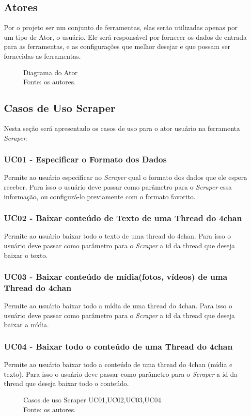 \subsection{Atores}
Por o projeto ser um conjunto de ferramentas, elas serão utilizadas apenas por um tipo de Ator, o usuário. Ele será responsável por fornecer os dados de entrada para as ferramentas, e as configurações que melhor desejar e que possam ser fornecidas as ferramentas.
\begin{figure}[H]
    \centering
    
    \caption[Diagrama do Ator]{\label{fig:diagrama_do_ator}
        Diagrama do Ator\\
        Fonte: os autores.
    }
\end{figure}
\subsection{Casos de Uso Scraper}
Nesta seção será apresentado os casos de uso para o ator usuário na ferramenta \textit{Scraper}.
\subsubsection{UC01 - Especificar o Formato dos Dados}
Permite ao usuário especificar ao \textit{Scraper} qual o formato dos dados que ele espera receber. Para isso o usuário deve passar como parâmetro para o \textit{Scraper} essa informação, ou configurá-lo previamente com o formato favorito.
\subsubsection{UC02 - Baixar conteúdo de Texto de uma Thread do 4chan}
Permite ao usuário baixar todo o texto de uma thread do 4chan. Para isso o usuário deve passar como parâmetro para o \textit{Scraper} a id da thread que deseja baixar o texto.
\subsubsection{UC03 - Baixar conteúdo de mídia(fotos, vídeos)  de uma Thread do 4chan}
Permite ao usuário baixar todo a mídia de uma thread do 4chan. Para isso o usuário deve passar como parâmetro para o \textit{Scraper} a id da thread que deseja baixar a mídia.
\subsubsection{UC04 - Baixar todo o conteúdo de uma Thread do 4chan}
Permite ao usuário baixar todo a conteúdo de uma thread do 4chan (mídia e texto). Para isso o usuário deve passar como parâmetro para o \textit{Scraper} a id da thread que deseja baixar todo o conteúdo.
\begin{figure}[ht]
    \centering
    
    \caption[Casos de uso Scraper UC01, UC02, UC03, e UC04]{\label{fig:Ator_Scraper1}
        Casos de uso Scraper UC01,UC02,UC03,UC04\\
        Fonte: os autores.
    }
\end{figure}
